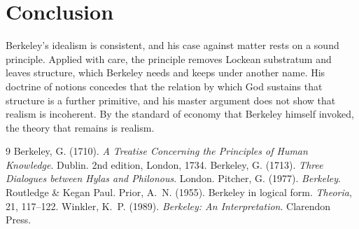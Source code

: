 \documentclass{situationist-preprint}
\begin{document}
\section{Conclusion}

Berkeley's idealism is consistent, and his case against matter rests on a sound principle. Applied with care, the principle removes Lockean substratum and leaves structure, which Berkeley needs and keeps under another name. His doctrine of notions concedes that the relation by which God sustains that structure is a further primitive, and his master argument does not show that realism is incoherent. By the standard of economy that Berkeley himself invoked, the theory that remains is realism.

\begin{thebibliography}{9}\small
{} Berkeley, G. (1710). \emph{A Treatise Concerning the Principles of Human Knowledge}. Dublin. 2nd edition, London, 1734.
 Berkeley, G. (1713). \emph{Three Dialogues between Hylas and Philonous}. London.
 Pitcher, G. (1977). \emph{Berkeley}. Routledge \& Kegan Paul.
 Prior, A.~N. (1955). Berkeley in logical form. \emph{Theoria}, 21, 117--122.
 Winkler, K.~P. (1989). \emph{Berkeley: An Interpretation}. Clarendon Press.
\end{thebibliography}
\end{document}

